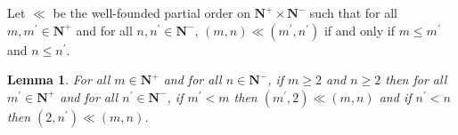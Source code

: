 \documentclass[draft]{article}
\newtheorem{lemma}{Lemma}
\def\N{\mathbb{N}}
\begin{document}
%
%
\\
\\
%
%
Let $\ll$ be the well-founded partial order on $\mathbf{N}^{+}{\times}\mathbf{N}^{-}$ such that for all $m,m^{\prime}{\in}\mathbf{N}^{+}$ and for all $n,n^{\prime}{\in}\mathbf{N}^{-}$,
%
%
%
%
%
%
%
%
%
%
%
%
%
%
%
%
$(m,n){\ll}(m^{\prime},n^{\prime})$ if and only if $m{\leq}m^{\prime}$ and $n{\leq}n^{\prime}$.
%
%
%
%
%
%
%
%
%
%
%
%
%
%
%
%
%
%
%
%
%
%
%
%
%
%
%
%
%
%
%
%
%
%
\begin{lemma}\label{lemma:property:of:the:well:founded:order:between:pairs}
%
%
For all $m{\in}\mathbf{N}^{+}$ and for all $n{\in}\mathbf{N}^{-}$, if $m{\geq}2$ and $n{\geq}2$ then for all $m^{\prime}{\in}\mathbf{N}^{+}$ and for all $n^{\prime}{\in}\mathbf{N}^{-}$, if $m^{\prime}{<}m$ then $(m^{\prime},2){\ll}(m,n)$ and if $n^{\prime}{<}n$ then $(2,n^{\prime}){\ll}(m,n)$.
%
%
\end{lemma}
%
%
\end{document}
